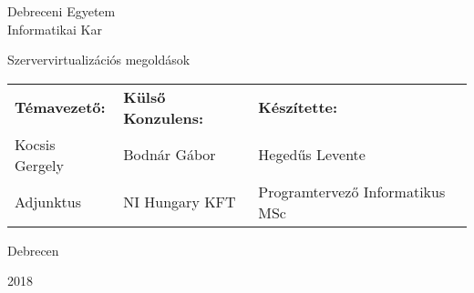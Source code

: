 \documentclass{memoir}
\begin{document}
\Large
\begin{center}
Debreceni Egyetem\\
Informatikai Kar
\end{center}

\vspace*{\fill}
\begin{vplace}[0.9]
\begin{center}
\HUGE
Szervervirtualizációs megoldások
\end{center}
\end{vplace}

\Large
\begin{tabu} to \linewidth{ X[c] X[c] X[c] }
\textbf{Témavezető:} & \textbf{Külső Konzulens:} & \textbf{ Készítette: }\\ 
Kocsis Gergely & Bodnár Gábor & Hegedűs Levente \\
Adjunktus & NI Hungary KFT & Programtervező Informatikus MSc \\
\end{tabu}


\vspace*{100pt}
\LARGE{
\begin{center}
Debrecen

2018
\end{center}
}
\end{document}
